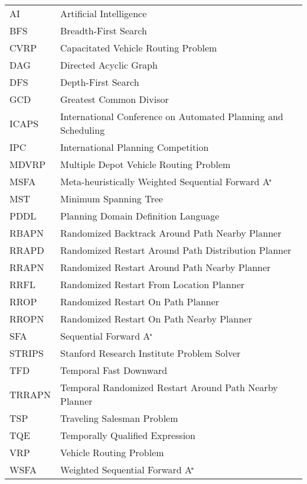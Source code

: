 
\begin{tabular}{@{}ll}
AI & Artificial Intelligence\\
BFS & Breadth-First Search\\
CVRP & Capacitated Vehicle Routing Problem\\
DAG & Directed Acyclic Graph\\
DFS & Depth-First Search\\
GCD & Greatest Common Divisor\\
ICAPS & International Conference on Automated Planning and Scheduling\\
IPC & International Planning Competition\\
MDVRP & Multiple Depot Vehicle Routing Problem\\
MSFA & Meta-heuristically Weighted Sequential Forward A$^{\kern-.15em*}$\\
MST & Minimum Spanning Tree\\
PDDL & Planning Domain Definition Language\\
RBAPN & Randomized Backtrack Around Path Nearby Planner\\
RRAPD & Randomized Restart Around Path Distribution Planner\\
RRAPN & Randomized Restart Around Path Nearby Planner\\
RRFL & Randomized Restart From Location Planner\\
RROP & Randomized Restart On Path Planner\\
RROPN & Randomized Restart On Path Nearby Planner\\
SFA & Sequential Forward A$^{\kern-.15em*}$\\
STRIPS & Stanford Research Institute Problem Solver\\
TFD & Temporal Fast Downward\\
TRRAPN & Temporal Randomized Restart Around Path Nearby Planner\\
TSP & Traveling Salesman Problem\\
TQE & Temporally Qualified Expression\\
VRP & Vehicle Routing Problem\\
WSFA & Weighted Sequential Forward A$^{\kern-.15em*}$\\
\end{tabular}

